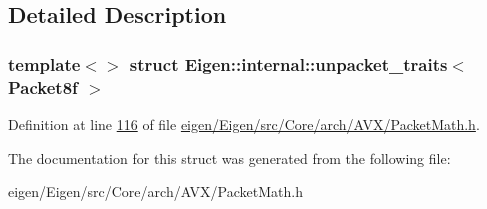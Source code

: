 \subsection{Detailed Description}
\subsubsection*{template$<$$>$\newline
struct Eigen\+::internal\+::unpacket\+\_\+traits$<$ Packet8f $>$}



Definition at line \hyperlink{eigen_2_eigen_2src_2_core_2arch_2_a_v_x_2_packet_math_8h_source_l00116}{116} of file \hyperlink{eigen_2_eigen_2src_2_core_2arch_2_a_v_x_2_packet_math_8h_source}{eigen/\+Eigen/src/\+Core/arch/\+A\+V\+X/\+Packet\+Math.\+h}.



The documentation for this struct was generated from the following file\+:\begin{DoxyCompactItemize}
\item 
eigen/\+Eigen/src/\+Core/arch/\+A\+V\+X/\+Packet\+Math.\+h\end{DoxyCompactItemize}
